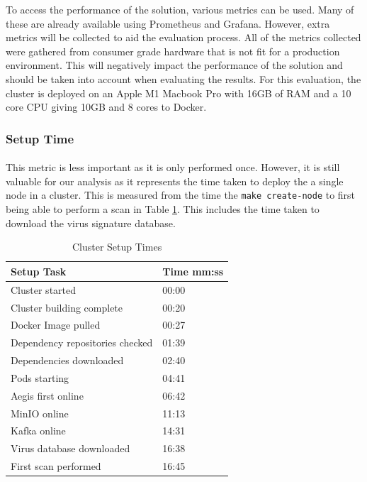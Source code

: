 \documentclass[12pt, conference, final, a4paper, onecolumn, compsoc]{IEEEtran}
\begin{document}
To access the performance of the solution, various metrics can be used. Many of
these are already available using Prometheus and Grafana. However, extra metrics
will be collected to aid the evaluation process. All of the metrics collected
were gathered from consumer grade hardware that is not fit for a production
environment. This will negatively impact the performance of the solution and
should be taken into account when evaluating the results. For this evaluation,
the cluster is deployed on an Apple M1 Macbook Pro with 16GB of RAM and a 10
core CPU giving 10GB and 8 cores to Docker.

\subsubsection*{Setup Time}
\paragraph{}

This metric is less important as it is only performed once. However, it is still
valuable for our analysis as it represents the time taken to deploy the a single
node in a cluster. This is measured from the time the \texttt{make create-node}
to first being able to perform a scan in Table \ref{tab:setup_timings}. This
includes the time taken to download the virus signature database.

\begin{table}[H] \centering
  \begin{tabular}{|l|l|}
    \hline
    \textbf{Setup Task}             & \textbf{Time mm:ss} \\ \hline
    Cluster started                 & 00:00         \\ \hline
    Cluster building complete       & 00:20         \\ \hline
    Docker Image pulled             & 00:27         \\ \hline
    Dependency repositories checked & 01:39         \\ \hline
    Dependencies downloaded         & 02:40         \\ \hline
    Pods starting                   & 04:41         \\ \hline
    Aegis first online              & 06:42         \\ \hline
    MinIO online                    & 11:13         \\ \hline
    Kafka online                    & 14:31         \\ \hline
    Virus database downloaded       & 16:38         \\ \hline
    First scan performed            & 16:45         \\ \hline
  \end{tabular}
  \caption{Cluster Setup Times}
  \label{tab:setup_timings}
\end{table}
\end{document}
